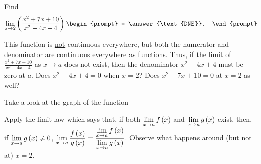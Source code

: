 \documentclass{ximera}
\author{Gregory Hartman \and Matthew Carr}
\begin{document}
\begin{exercise}



  Find 
  \[
  \lim_{x\to 2} \p{\frac{x^2+7x+10}{x^2-4x+4}}
  \begin{prompt}
  = \answer{\text{DNE}}.
  \end{prompt}
  \]
    \begin{hint}
     This function is \underline{not} continuous everywhere, but both the numerator and denominator are continuous everywhere as functions. Thus, if the limit of $\frac{x^2+7x+10}{x^2-4x+4}$ as $x\to{a}$ does not exist, then the denominator $x^2-4x+4$ must be zero at $a$. Does $x^2-4x+4=0$ when $x=2$? Does $x^2+7x+10=0$ at $x=2$ as well?
    \end{hint}
     \begin{hint}
    	Take a look at the graph of the function
    \begin{center}
      \end{center} 
      Apply the limit law which says that, if both $\lim_{x\to a}f\p{x}$ and $\lim_{x\to a}g\p{x}$ exist, then, if $\lim_{x\to a}g\p{x}\ne0$, $\lim_{x\to{a}}\frac{f\p{x}}{g\p{x}}=\frac{\lim_{x\to a}f\p{x}}{\lim_{x\to{a}}g\p{x}}$. Observe what happens around (but not at) $x=2$.
    \end{hint}
    \begin{hint}

\end{hint}
\end{exercise}
\end{document}
